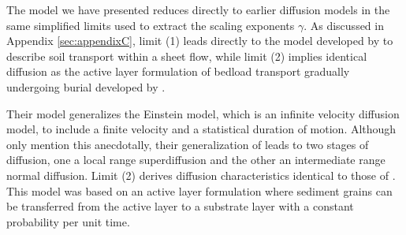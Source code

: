 \documentclass[]{agujournal2018}
\begin{document}

The model we have presented reduces directly to earlier diffusion models in the same simplified limits used to extract the scaling exponents $\gamma$.
As discussed in Appendix \ref{sec:appendixC}, limit (1) leads directly to the model developed by \citet{Lisle1998} to describe soil transport within a sheet flow, while limit (2) implies identical diffusion as the active layer formulation of bedload transport gradually undergoing burial developed by \citet{Wu2019}.


Their model generalizes the Einstein model, which is an infinite velocity diffusion model, to include a finite velocity and a statistical duration of motion.
Although \citet{Lisle1998} only mention this anecdotally, their generalization of \citet{Einstein1937} leads to two stages of diffusion, one a local range superdiffusion and the other an intermediate range normal diffusion.
Limit (2) derives diffusion characteristics identical to those of \citet{Wu2019}.
This model was based on an active layer formulation where sediment grains can be transferred from the active layer to a substrate layer with a constant probability per unit time.
\end{document}
